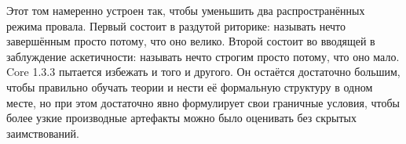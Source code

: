 Этот том намеренно устроен так, чтобы уменьшить два распространённых режима провала.
Первый состоит в раздутой риторике: называть нечто завершённым просто потому, что оно велико.
Второй состоит во вводящей в заблуждение аскетичности: называть нечто строгим просто потому, что оно мало.
Core 1.3.3 пытается избежать и того и другого.
Он остаётся достаточно большим, чтобы правильно обучать теории и нести её формальную структуру в одном месте, но при этом достаточно явно формулирует свои граничные условия, чтобы более узкие производные артефакты можно было оценивать без скрытых заимствований.

\clearpage
